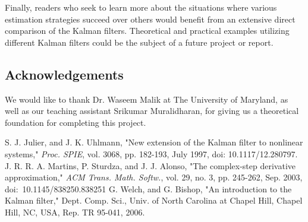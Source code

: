 \documentclass[]{article}
\begin{document}
Finally, readers who seek to learn more about the situations where various estimation strategies succeed over others would benefit from an extensive direct comparison of the Kalman filters. Theoretical and practical examples utilizing different Kalman filters could be the subject of a future project or report.

\subsection{Acknowledgements}

We would like to thank Dr. Waseem Malik at The University of Maryland, as well as our teaching assistant Srikumar Muralidharan, for giving us a theoretical foundation for completing this project.

\begin{thebibliography}{00}
 S. J. Julier, and J. K. Uhlmann, "New extension of the Kalman filter to nonlinear systems," \textit{Proc. SPIE}, vol. 3068, pp. 182-193, July 1997, doi: 10.1117/12.280797.
 J. R. R. A. Martins, P. Sturdza, and J. J. Alonso, "The complex-step derivative approximation," \textit{ACM Trans. Math. Softw.}, vol. 29, no. 3, pp. 245-262, Sep. 2003, doi:~10.1145/838250.838251
 G. Welch, and G. Bishop, "An introduction to the Kalman filter," Dept. Comp. Sci., Univ. of North Carolina at Chapel Hill, Chapel Hill, NC, USA, Rep. TR 95-041, 2006.

\end{thebibliography}
\end{document}
